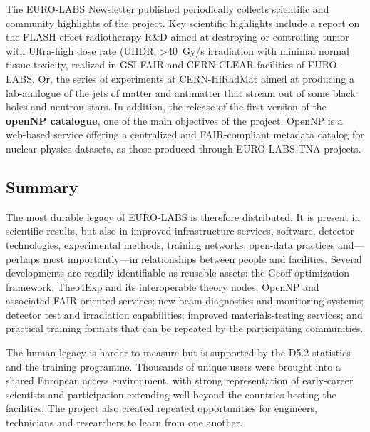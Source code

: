 The EURO-LABS Newsletter published periodically collects scientific and community highlights of the project. Key scientific highlights include a report on the FLASH effect radiotherapy R\&D aimed at destroying or controlling tumor with Ultra-high dose rate (UHDR; >\SI{40}{Gy/s} irradiation with minimal normal tissue toxicity, realized in GSI-FAIR and CERN-CLEAR facilities of EURO-LABS. Or, the series of experiments at CERN-HiRadMat aimed at producing a lab-analogue of the jets of matter and antimatter that stream out of some black holes and neutron stars. In addition, the release of the first version of the \textbf{openNP catalogue}, one of the main objectives of the project. OpenNP is a web-based service offering a centralized and FAIR-compliant metadata catalog for nuclear physics datasets, as those produced through EURO-LABS TNA projects.

\FloatBarrier   %
\subsection{Summary}
The most durable legacy of EURO-LABS is therefore distributed. It is present in scientific results, but also in improved infrastructure services, software, detector technologies, experimental methods, training networks, open-data practices and—perhaps most importantly—in relationships between people and facilities.
Several developments are readily identifiable as reusable assets: the Geoff optimization framework; Theo4Exp and its interoperable theory nodes; OpenNP and associated FAIR-oriented services; new beam diagnostics and monitoring systems; detector test and irradiation capabilities; improved materials-testing services; and practical training formats that can be repeated by the participating communities.

The human legacy is harder to measure but is supported by the D5.2 statistics and the training programme. Thousands of unique users were brought into a shared European access environment, with strong representation of early-career scientists and participation extending well beyond the countries hosting the facilities. The project also created repeated opportunities for engineers, technicians and researchers to learn from one another.

